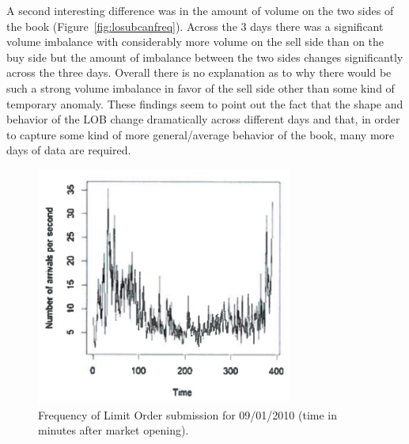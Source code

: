A second interesting difference was in the amount of volume on the two sides of the book (Figure~\ref{fig:losubcanfreq}). Across the 3 days there was a significant volume imbalance with considerably more volume on the sell side than on the buy side but the amount of imbalance between the two sides changes significantly across the three days. Overall there is no explanation as to why there would be such a strong volume imbalance in favor of the sell side other than some kind of temporary anomaly. These findings seem to point out the fact that the shape and behavior of the LOB change dramatically across different days and that, in order to capture some kind of more general/average behavior of the book, many more days of data are required. 
	\begin{figure}[!ht]
   	\centering
   	\includegraphics[width=0.75\textwidth]{chapters/chapter_trade_data_models/figures/freqsubmit.png} 
   	\caption{Frequency of Limit Order submission for 09/01/2010 (time in minutes after market opening). \label{fig:freqsubmit1}}
	\end{figure}
